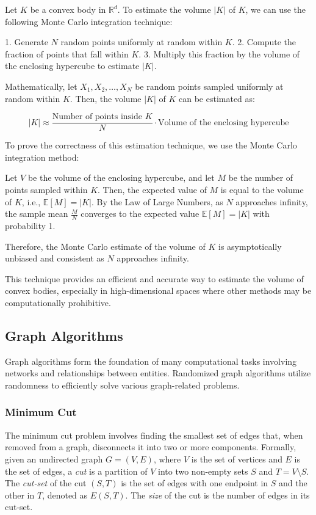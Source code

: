 \documentclass[12pt]{book} %
\begin{document}
Let \(K\) be a convex body in \(\mathbb{R}^d\). To estimate the volume \(|K|\) of \(K\), we can use the following Monte Carlo integration technique:

1. Generate \(N\) random points uniformly at random within \(K\).
2. Compute the fraction of points that fall within \(K\).
3. Multiply this fraction by the volume of the enclosing hypercube to estimate \(|K|\).

Mathematically, let \(X_1, X_2, \ldots, X_N\) be random points sampled uniformly at random within \(K\). Then, the volume \(|K|\) of \(K\) can be estimated as:

\[
|K| \approx \frac{\text{Number of points inside } K}{N} \cdot \text{Volume of the enclosing hypercube}
\]

To prove the correctness of this estimation technique, we use the Monte Carlo integration method:

Let \(V\) be the volume of the enclosing hypercube, and let \(M\) be the number of points sampled within \(K\). Then, the expected value of \(M\) is equal to the volume of \(K\), i.e., \(\mathbb{E}[M] = |K|\). By the Law of Large Numbers, as \(N\) approaches infinity, the sample mean \(\frac{M}{N}\) converges to the expected value \(\mathbb{E}[M] = |K|\) with probability 1.

Therefore, the Monte Carlo estimate of the volume of \(K\) is asymptotically unbiased and consistent as \(N\) approaches infinity.

This technique provides an efficient and accurate way to estimate the volume of convex bodies, especially in high-dimensional spaces where other methods may be computationally prohibitive.

\subsection{Graph Algorithms}
Graph algorithms form the foundation of many computational tasks involving networks and relationships between entities. Randomized graph algorithms utilize randomness to efficiently solve various graph-related problems.

\subsubsection{Minimum Cut}
The minimum cut problem involves finding the smallest set of edges that, when removed from a graph, disconnects it into two or more components. Formally, given an undirected graph \(G = (V, E)\), where \(V\) is the set of vertices and \(E\) is the set of edges, a \textit{cut} is a partition of \(V\) into two non-empty sets \(S\) and \(T = V \setminus S\). The \textit{cut-set} of the cut \((S, T)\) is the set of edges with one endpoint in \(S\) and the other in \(T\), denoted as \(E(S, T)\). The \textit{size} of the cut is the number of edges in its cut-set.
\end{document}

